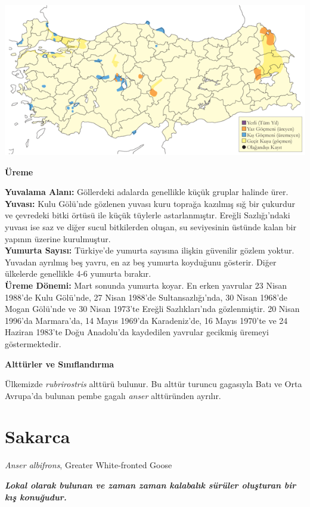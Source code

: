 \documentclass[
  letterpaper,
  DIV=11,
  numbers=noendperiod]{scrreprt}
\begin{document}
\includegraphics{images/harita_Page_002.png}

\textbf{Üreme}

\textbf{Yuvalama Alanı:} Göllerdeki adalarda genellikle küçük gruplar
halinde ürer.\\
\textbf{Yuvası:} Kulu Gölü'nde gözlenen yuvası kuru toprağa kazılmış sığ
bir çukurdur ve çevredeki bitki örtüsü ile küçük tüylerle
astarlanmıştır. Ereğli Sazlığı'ndaki yuvası ise saz ve diğer sucul
bitkilerden oluşan, su seviyesinin üstünde kalan bir yapının üzerine
kurulmuştur.\\
\textbf{Yumurta Sayısı:} Türkiye'de yumurta sayısına ilişkin güvenilir
gözlem yoktur. Yuvadan ayrılmış beş yavru, en az beş yumurta koyduğunu
gösterir. Diğer ülkelerde genellikle 4-6 yumurta bırakır.\\
\textbf{Üreme Dönemi:} Mart sonunda yumurta koyar. En erken yavrular 23
Nisan 1988'de Kulu Gölü'nde, 27 Nisan 1988'de Sultansazlığı'nda, 30
Nisan 1968'de Mogan Gölü'nde ve 30 Nisan 1973'te Ereğli Sazlıkları'nda
gözlenmiştir. 20 Nisan 1996'da Marmara'da, 14 Mayıs 1969'da
Karadeniz'de, 16 Mayıs 1970'te ve 24 Haziran 1983'te Doğu Anadolu'da
kaydedilen yavrular gecikmiş üremeyi göstermektedir.

\textbf{Alttürler ve Sınıflandırma}

Ülkemizde \emph{rubrirostris} alttürü bulunur. Bu alttür turuncu
gagasıyla Batı ve Orta Avrupa'da bulunan pembe gagalı \emph{anser}
alttüründen ayrılır.

\section{Sakarca}\label{sakarca}

\emph{Anser albifrons}, Greater White-fronted Goose

\textbf{\emph{Lokal olarak bulunan ve zaman zaman kalabalık sürüler
oluşturan bir kış konuğudur.}}
\end{document}
